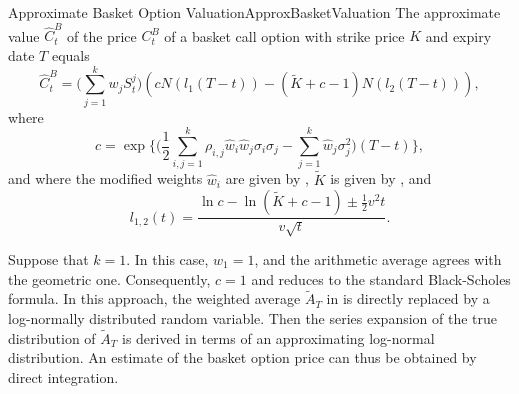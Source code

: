 \begin{prop}{Approximate Basket Option Valuation}{ApproxBasketValuation}
	The approximate value \(\hat{C}_t^B\) of the price \(C_t^B\) of a basket call option with strike price \(K\) and expiry date \(T\) equals
	\begin{equation} \label{eq:ApproxBasketCallPrice}
		\hat{C}_t^B = \biggl( \sum_{j=1}^k w_j S_t^j \biggr) (c N(l_1(T-t)) - (\tilde{K} + c - 1) N(l_2(T-t))),
	\end{equation}
	where
	\begin{equation} \label{eq:ParameterC}
		c = \exp \biggl\{ \biggl( \frac{1}{2} \sum_{i,j=1}^k \rho_{i,j} \hat{w}_i \hat{w}_j \sigma_i \sigma_j - \sum_{j=1}^k \hat{w}_j \sigma_j^2 \biggr) (T-t) \biggr\},
	\end{equation}
	and where the modified weights \(\hat{w}_i\) are given by , \(\tilde{K}\) is given by , and
	\begin{equation} \label{eq:LTermsDef}
		l_{1,2}(t) = \frac{\ln c - \ln(\tilde{K} + c - 1) \pm \frac{1}{2} v^2 t}{v \sqrt{t}}.
	\end{equation}
\end{prop}

Suppose that \(k=1\). In this case, \(w_1 = 1\), and the arithmetic average agrees with the geometric one. Consequently, \(c=1\) and  reduces to the standard Black-Scholes formula. In this approach, the weighted average \(\tilde{A}_T\) in  is directly replaced by a log-normally distributed random variable. Then the series expansion of the true distribution of \(\tilde{A}_T\) is derived in terms of an approximating log-normal distribution. An estimate of the basket option price can thus be obtained by direct integration.
